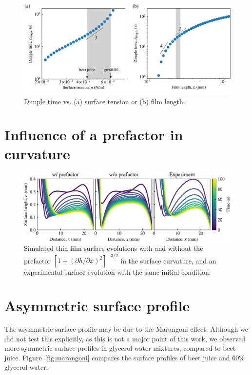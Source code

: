 \documentclass[aps,prfluids,amsmath,amssymb,superscriptaddress,longbibliography]{revtex4-2}
\newif\ifhighlight
\newcommand{\hl}[1]{\ifhighlight\textcolor{blue}{#1}\else#1\fi}
\begin{document}
\begin{figure}[ht]
    \centering
    \includegraphics[width=.8\textwidth]{surface_tension_and_film_length}
    \caption{
    \hl{Dimple time vs. (a) surface tension or (b) film length.}
    }
    \label{fig:surfL}
\end{figure}


\section{Influence of a prefactor in curvature}\label{app:prefactor}

\begin{figure}[ht]
    \centering
    \includegraphics[width=.8\textwidth]{prefactor}
    \caption{
    \hl{Simulated thin film surface evolutions with and without the prefactor $[1+(\partial h/\partial x)^2]^{-3/2}$ in the surface curvature, and an experimental surface evolution with the same initial condition.}
    }
    \label{fig:prefactor}
\end{figure}

\newpage

\section{Asymmetric surface profile}\label{app:marangoni}

\hl{The asymmetric surface profile may be due to the Marangoni effect. Although we did not test this explicitly, as this is not a major point of this work, we observed more symmetric surface profiles in glycerol-water mixtures, compared to beet juice. 
Figure~\ref{fig:marangoni} compares the surface profiles of beet juice and 60\% glycerol-water.}
\end{document}
